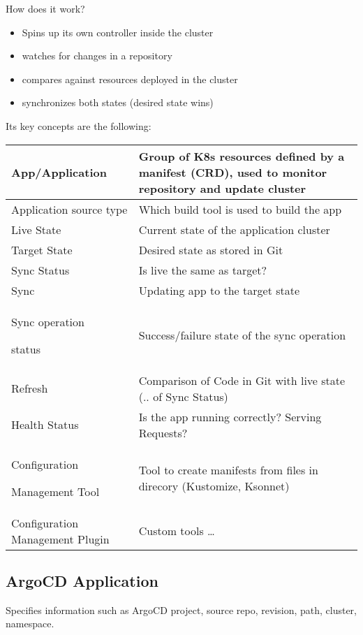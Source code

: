 \noindent
How does it work?
\begin{itemize}
    \item Spins up its own controller inside the cluster
    \item watches for changes in a repository
    \item compares against resources deployed in the cluster
    \item synchronizes both states (desired state wins)
\end{itemize}

\noindent
Its key concepts are the following:
\renewcommand{\arraystretch}{1.5}
\begin{center}
    \begin{tabular}{p{}|p{}}
        App/Application & Group of K8s resources defined by a manifest (CRD), used to monitor repository and update cluster \\
        \hline
        Application source type & Which build tool is used to build the app \\
        \hline
        Live State & Current state of the application cluster \\
        \hline
        Target State & Desired state as stored in Git \\
        \hline
        Sync Status & Is live the same as target? \\ 
        \hline
        Sync & Updating app to the target state \\
        \hline
        Sync operation 
        
        status & Success/failure state of the sync operation \\
        \hline
        Refresh & Comparison of Code in Git with live state (.. of Sync Status) \\
        \hline
        Health Status & Is the app running correctly? Serving Requests? \\
        \hline
        Configuration
        
        Management Tool & Tool to create manifests from files in direcory (Kustomize, Ksonnet) \\
        \hline
        Configuration Management Plugin &  Custom tools \ldots \\
    \end{tabular}
\end{center}

\subsection{ArgoCD Application}
Specifies information such as ArgoCD project, source repo, revision, path, cluster, namespace.

